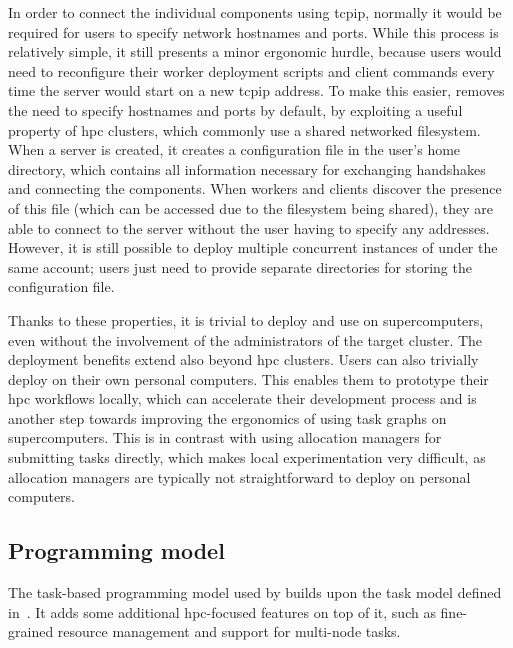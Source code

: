 In order to connect the individual components using \gls{tcpip}, normally it would be
required for users to specify network hostnames and ports. While this process is relatively simple,
it still presents a minor ergonomic hurdle, because users would need to reconfigure their worker
deployment scripts and client commands every time the server would start on a new
\gls{tcpip} address. To make this easier, \hyperqueue{} removes the need to
specify hostnames and ports by default, by exploiting a useful property of \gls{hpc}
clusters, which commonly use a shared networked filesystem. When a server is created, it creates a
configuration file in the user's home directory, which contains all information necessary for
exchanging handshakes and connecting the components. When workers and clients discover the presence
of this file (which can be accessed due to the filesystem being shared), they are able to connect
to the server without the user having to specify any addresses. However, it is still possible to
deploy multiple concurrent instances of \hyperqueue{} under the same account; users just
need to provide separate directories for storing the configuration file.

Thanks to these properties, it is trivial to deploy and use \hyperqueue{} on
supercomputers, even without the involvement of the administrators of the target cluster. The
deployment benefits extend also beyond \gls{hpc} clusters. Users can also trivially
deploy \hyperqueue{} on their own personal computers. This enables them to prototype
their \gls{hpc} workflows locally, which can accelerate their development process and
is another step towards improving the ergonomics of using task graphs on supercomputers. This is in
contrast with using allocation managers for submitting tasks directly, which makes local
experimentation very difficult, as allocation managers are typically not straightforward to deploy
on personal computers.

\subsection{Programming model}
\label{sec:hq-programming-model}
The task-based programming model used by \hyperqueue{} builds upon the task model defined
in~. It adds some additional \gls{hpc}-focused features on top
of it, such as fine-grained resource management and support for multi-node tasks.

